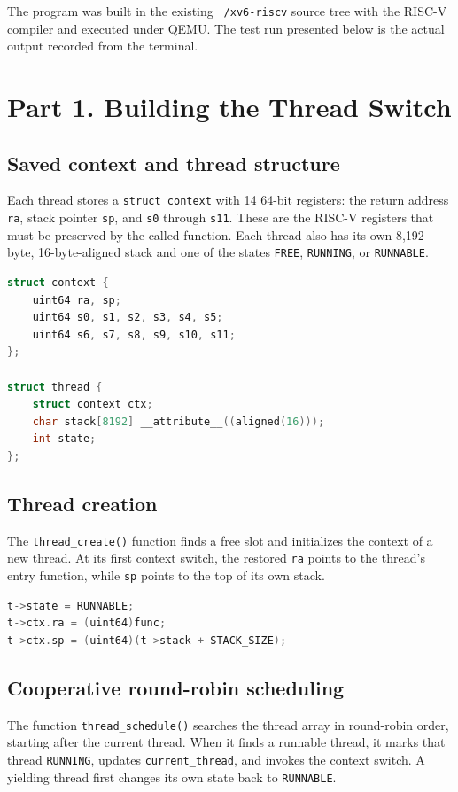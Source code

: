 \documentclass[12pt,a4paper]{article}
\begin{document}
The program was built in the existing \texttt{~/xv6-riscv} source tree with the RISC-V compiler and executed under QEMU. The test run presented below is the actual output recorded from the terminal.

\section{Part 1. Building the Thread Switch}
\subsection{Saved context and thread structure}
Each thread stores a \texttt{struct context} with 14 64-bit registers: the return address \texttt{ra}, stack pointer \texttt{sp}, and \texttt{s0} through \texttt{s11}. These are the RISC-V registers that must be preserved by the called function. Each thread also has its own 8,192-byte, 16-byte-aligned stack and one of the states \texttt{FREE}, \texttt{RUNNING}, or \texttt{RUNNABLE}.

\begin{lstlisting}[style=source,language=C]
struct context {
    uint64 ra, sp;
    uint64 s0, s1, s2, s3, s4, s5;
    uint64 s6, s7, s8, s9, s10, s11;
};

struct thread {
    struct context ctx;
    char stack[8192] __attribute__((aligned(16)));
    int state;
};
\end{lstlisting}

\subsection{Thread creation}
The \texttt{thread\_create()} function finds a free slot and initializes the context of a new thread. At its first context switch, the restored \texttt{ra} points to the thread's entry function, while \texttt{sp} points to the top of its own stack.

\begin{lstlisting}[style=source,language=C]
t->state = RUNNABLE;
t->ctx.ra = (uint64)func;
t->ctx.sp = (uint64)(t->stack + STACK_SIZE);
\end{lstlisting}

\subsection{Cooperative round-robin scheduling}
The function \texttt{thread\_schedule()} searches the thread array in round-robin order, starting after the current thread. When it finds a runnable thread, it marks that thread \texttt{RUNNING}, updates \texttt{current\_thread}, and invokes the context switch. A yielding thread first changes its own state back to \texttt{RUNNABLE}.
\end{document}
